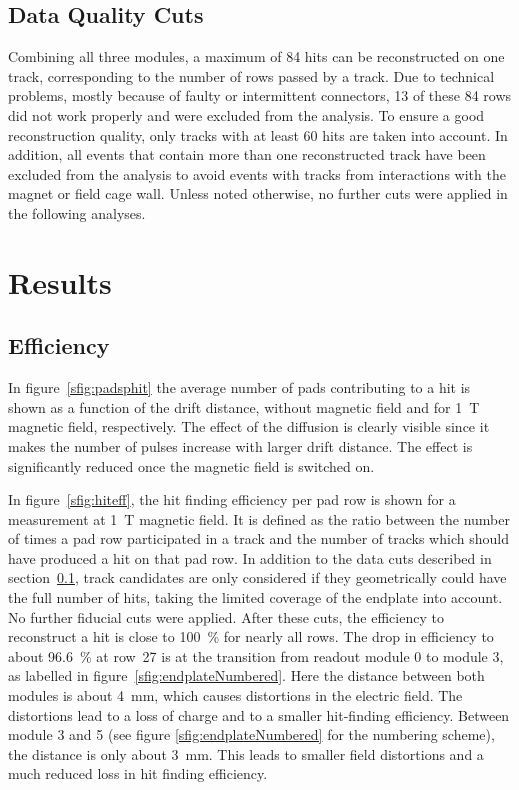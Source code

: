 \documentclass[preprint]{elsarticle}
\begin{document}
\subsection{Data Quality Cuts}
\label{sec:cuts}
Combining all three modules, a maximum of 84 hits can be reconstructed on one track, corresponding to the number of rows passed by a track. Due to technical problems, mostly because of faulty or intermittent connectors, 13 of these 84 rows did not work properly and were excluded from the analysis. To ensure a good reconstruction quality, only tracks with at least 60 hits are taken into account.
In addition, all events that contain more than one reconstructed track have been excluded from the analysis to avoid events with tracks from interactions with the magnet or field cage wall. Unless noted otherwise, no further cuts were applied in the following analyses.
                                                                                                                                                                     
\section{Results}
\subsection{Efficiency}
In figure~\ref{sfig:padsphit} the average number of pads contributing to a hit is shown as a function of the drift distance, without magnetic field and for \SI{1}{\tesla} magnetic field, respectively. The effect of the diffusion is clearly visible since it makes the number of pulses increase with larger drift distance. The effect is significantly reduced once the magnetic field is switched on. 

In figure~\ref{sfig:hiteff}, the hit finding efficiency per pad row is shown for a measurement at \SI{1}{\tesla} magnetic field. It is defined as the ratio between the number of times a pad row participated in a track and the number of tracks which should have produced a hit on that pad row. 
In addition to the data cuts described in section~\ref{sec:cuts}, track candidates are only considered if they geometrically could have the full number of hits, taking the limited coverage of the endplate into account. No further fiducial cuts were applied. After these cuts, the efficiency to reconstruct a hit is close to \SI{100}{\percent} for nearly all rows. The drop in efficiency to about \SI{96.6}{\percent} at row~27 is at the transition from readout module 0 to module 3, as labelled in figure~\ref{sfig:endplateNumbered}. Here the distance between both modules is about \SI{4}{\mm}, which causes distortions in the electric field. The distortions lead to a loss of charge and to a smaller hit-finding efficiency. Between module 3 and 5 (see figure \ref{sfig:endplateNumbered} for the numbering scheme), the distance is only about \SI{3}{\mm}. This leads to smaller field distortions and a much reduced loss in hit finding efficiency.
\end{document}
